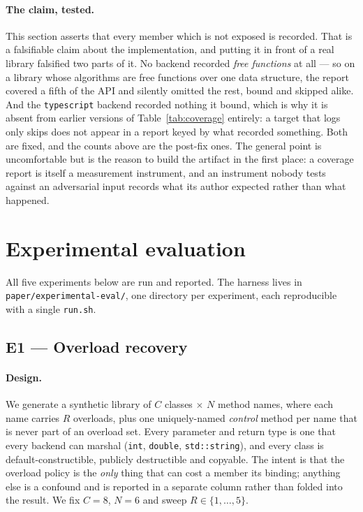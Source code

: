 \documentclass[11pt,a4paper]{article}
\newcommand{\code}[1]{\texttt{\small #1}}
\begin{document}
\paragraph{The claim, tested.} This section asserts that every member which is
not exposed is recorded. That is a falsifiable claim about the implementation,
and putting it in front of a real library falsified two parts of it. No backend
recorded \emph{free functions} at all --- so on a library whose algorithms are
free functions over one data structure, the report covered a fifth of the API
and silently omitted the rest, bound and skipped alike. And the
\code{typescript} backend recorded nothing it bound, which is why it is absent
from earlier versions of Table~\ref{tab:coverage} entirely: a target that logs
only skips does not appear in a report keyed by what recorded something. Both
are fixed, and the counts above are the post-fix ones. The general point is
uncomfortable but is the reason to build the artifact in the first place: a
coverage report is itself a measurement instrument, and an instrument nobody
tests against an adversarial input records what its author expected rather than
what happened.

\section{Experimental evaluation}
\label{sec:eval}

All five experiments below are run and reported. The harness lives in
\code{paper/experimental-eval/}, one directory per experiment, each reproducible
with a single \code{run.sh}.

\subsection{E1 --- Overload recovery}
\label{sec:e1}

\paragraph{Design.} We generate a synthetic library of $C$ classes $\times$ $N$
method names, where each name carries $R$ overloads, plus one uniquely-named
\emph{control} method per name that is never part of an overload set. Every
parameter and return type is one that every backend can marshal
(\code{int}, \code{double}, \code{std::string}), and every class is
default-constructible, publicly destructible and copyable. The intent is that
the overload policy is the \emph{only} thing that can cost a member its binding;
anything else is a confound and is reported in a separate column rather than
folded into the result. We fix $C=8$, $N=6$ and sweep $R \in \{1,\dots,5\}$.
\end{document}
